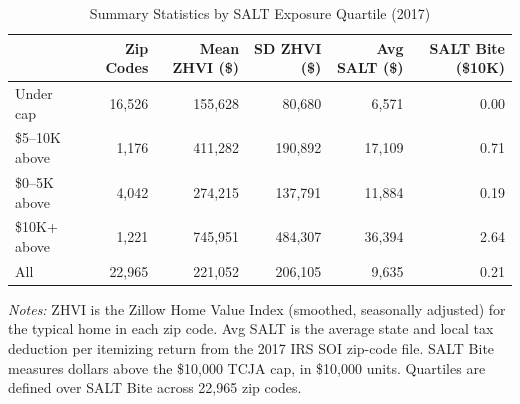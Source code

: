 \begin{table}[H]
\centering
\caption{Summary Statistics by SALT Exposure Quartile (2017)}
\label{tab:summary}
\begin{threeparttable}
{\small
\begin{tabular}{@{}lrrrrr@{}}
\toprule
 & Zip Codes & Mean ZHVI (\$) & SD ZHVI (\$) & Avg SALT (\$) & SALT Bite (\$10K) \\
\midrule
Under cap  & 16,526 & 155,628 & 80,680 & 6,571 & 0.00 \\
\$5--10K above & 1,176 & 411,282 & 190,892 & 17,109 & 0.71 \\
\$0--5K above & 4,042 & 274,215 & 137,791 & 11,884 & 0.19 \\
\$10K+ above & 1,221 & 745,951 & 484,307 & 36,394 & 2.64 \\
\midrule
All        & 22,965 & 221,052 & 206,105 & 9,635 & 0.21 \\
\bottomrule
\end{tabular}}
\begin{tablenotes}[flushleft]
\small
\item \textit{Notes:} ZHVI is the Zillow Home Value Index (smoothed, seasonally adjusted) for the typical home in each zip code. Avg SALT is the average state and local tax deduction per itemizing return from the 2017 IRS SOI zip-code file. SALT Bite measures dollars above the \$10,000 TCJA cap, in \$10,000 units. Quartiles are defined over SALT Bite across 22,965 zip codes.
\end{tablenotes}
\end{threeparttable}
\end{table}
